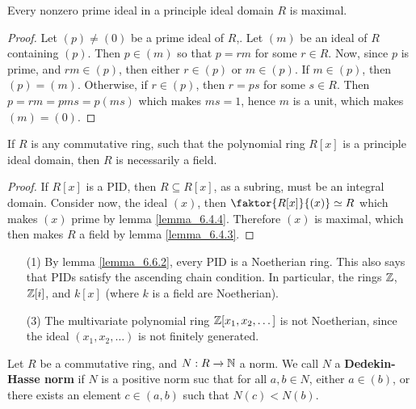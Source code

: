 \begin{lemma}\label{lemma_6.6.2}
  Every nonzero prime ideal in a principle ideal domain $R$ is maximal.
\end{lemma}
\begin{proof}
  Let $(p) \neq (0)$ be a prime ideal of $R$,. Let $(m)$ be an ideal of $R$
  containing $(p)$. Then $p \in (m)$ so that $p=rm$ for some  $r \in R$. Now,
  since $p$ is prime, and $rm \in (p)$, then either $r \in (p)$ or $m \in
  (p)$. If $m \in (p)$, then $(p)=(m)$. Otherwise, if $r \in (p)$, then $r=ps$
  for some  $s \in R$. Then  $p=rm=pms=p(ms)$ which makes $ms=1$, hence $m$ is
  a unit, which makes $(m)=(0)$.
\end{proof}
\begin{corollary}
  If $R$ is any commutative ring, such that the polynomial ring $R[x]$ is a
  principle ideal domain, then $R$ is necessarily a field.
\end{corollary}
\begin{proof}
  If $R[x]$ is a PID, then $R \subseteq R[x]$, as a subring, must be an
  integral domain. Consider now, the ideal $(x)$, then $\faktor{R[x]}{(x)}
  \simeq R$ which makes $(x)$ prime by lemma \ref{lemma_6.4.4}. Therefore $(x)$ is
  maximal, which then makes $R$ a field by lemma \ref{lemma_6.4.3}.
\end{proof}

\begin{example}\label{example_6.5}
  \begin{enumerate}
    \item[(1)] By lemma \ref{lemma_6.6.2}, every PID is a Noetherian
      ring. This also says that PIDs satisfy the ascending chain
      condition. In particular, the rings $\mathbb{Z}$, $\mathbb{Z}[i]$, and $k[x]$
      (where $k$ is a field are Noetherian).

    \item[(3)] The multivariate polynomial ring $\mathbb{Z}[x_1, x_2, \dots]$ is not
      Noetherian, since the ideal $(x_1, x_2, \dots)$ is not finitely
      generated.
  \end{enumerate}
\end{example}

\begin{definition}
  Let $R$ be a commutative ring, and  $N:R \xrightarrow{} \mathbb{N}$ a norm. We call
  $N$ a \textbf{Dedekin-Hasse norm} if $N$ is a positive norm suc that for
  all $a,b \in N$, either $a \in (b)$, or there exists an element $c \in
  (a,b)$ such that $N(c)<N(b)$.
\end{definition}

